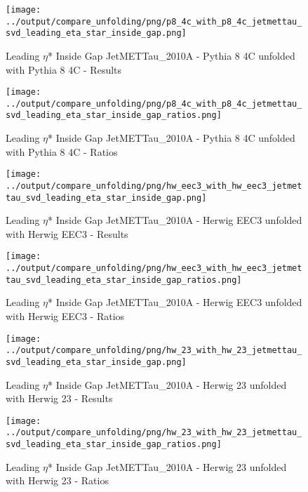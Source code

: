 \documentclass[11pt]{book}
\begin{document}
\begin{figure}[ht]
\centering
\texttt{[image: ../output/compare\_unfolding/png/p8\_4c\_with\_p8\_4c\_jetmettau\_svd\_leading\_eta\_star\_inside\_gap.png]}
\caption{Leading $\eta$* Inside Gap JetMETTau\_2010A - Pythia 8 4C unfolded with Pythia 8 4C - Results}
\label{p8_p8_jetmettau_svd_leading_eta_star_inside_gap_a}
\end{figure}

\begin{figure}[ht]
\centering
\texttt{[image: ../output/compare\_unfolding/png/p8\_4c\_with\_p8\_4c\_jetmettau\_svd\_leading\_eta\_star\_inside\_gap\_ratios.png]}
\caption{Leading $\eta$* Inside Gap JetMETTau\_2010A - Pythia 8 4C unfolded with Pythia 8 4C - Ratios}
\label{p8_p8_jetmettau_svd_leading_eta_star_inside_gap_b}
\end{figure}

\begin{figure}[ht]
\centering
\texttt{[image: ../output/compare\_unfolding/png/hw\_eec3\_with\_hw\_eec3\_jetmettau\_svd\_leading\_eta\_star\_inside\_gap.png]}
\caption{Leading $\eta$* Inside Gap JetMETTau\_2010A - Herwig EEC3 unfolded with Herwig EEC3 - Results}
\label{hw_eec3_hw_eec3_jetmettau_svd_leading_eta_star_inside_gap_a}
\end{figure}

\begin{figure}[ht]
\centering
\texttt{[image: ../output/compare\_unfolding/png/hw\_eec3\_with\_hw\_eec3\_jetmettau\_svd\_leading\_eta\_star\_inside\_gap\_ratios.png]}
\caption{Leading $\eta$* Inside Gap JetMETTau\_2010A - Herwig EEC3 unfolded with Herwig EEC3 - Ratios}
\label{hw_eec3_hw_eec3_jetmettau_svd_leading_eta_star_inside_gap_b}
\end{figure}

\begin{figure}[ht]
\centering
\texttt{[image: ../output/compare\_unfolding/png/hw\_23\_with\_hw\_23\_jetmettau\_svd\_leading\_eta\_star\_inside\_gap.png]}
\caption{Leading $\eta$* Inside Gap JetMETTau\_2010A - Herwig 23 unfolded with Herwig 23 - Results}
\label{hw_23_hw_23_jetmettau_svd_leading_eta_star_inside_gap_a}
\end{figure}

\begin{figure}[ht]
\centering
\texttt{[image: ../output/compare\_unfolding/png/hw\_23\_with\_hw\_23\_jetmettau\_svd\_leading\_eta\_star\_inside\_gap\_ratios.png]}
\caption{Leading $\eta$* Inside Gap JetMETTau\_2010A - Herwig 23 unfolded with Herwig 23 - Ratios}
\label{hw_23_hw_23_jetmettau_svd_leading_eta_star_inside_gap_b}
\end{figure}
\end{document}
